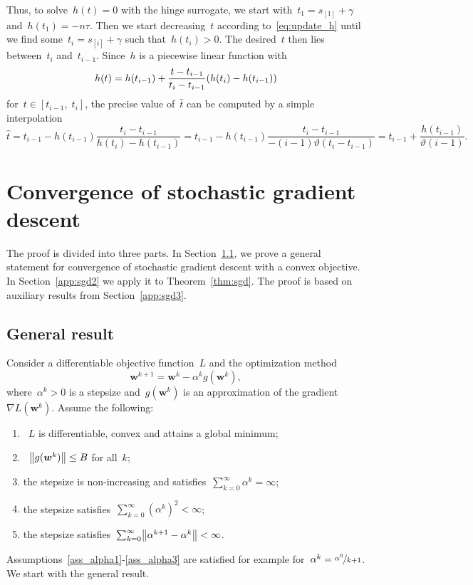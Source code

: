 \noindent Thus, to solve~$h(t) = 0$ with the hinge surrogate, we start with~$t_1 = s_{[1]}  + \gamma$ and~$h(t_1) = -n\tau$. Then we start decreasing~$t$ according to~\eqref{eq:update_h} until we find some~$t_i = s_{[i]} + \gamma$ such that~$h(t_i) > 0$. The desired~$t$ then lies between~$t_i$ and~$t_{i-1}$. Since~$h$ is a piecewise linear function with
\begin{equation*}
  h(t) = h(t_{i-1}) + \frac{t - t_{i-1}}{t_{i} - t_{i-1}}\Brac{h(t_{i}) - h(t_{i-1})}
\end{equation*}
for~$t \in [t_{i-1}, \; t_{i}]$, the precise value of~$\hat{t}$ can be computed by a simple interpolation
\begin{equation*}
  \hat{t}
    = t_{i-1} - h(t_{i-1})\frac{t_{i} - t_{i-1}}{h(t_{i}) - h(t_{i-1})}
    = t_{i-1} - h(t_{i-1})\frac{t_{i} - t_{i-1}}{-(i-1)\vartheta(t_{i} - t_{i-1})}
    = t_{i-1} + \frac{h(t_{i-1})}{\vartheta(i-1)}.
\end{equation*}

\section{Convergence of stochastic gradient descent}

The proof is divided into three parts. In Section~\ref{app:sgd1}, we prove a general statement for convergence of stochastic gradient descent with a convex objective. In Section~\ref{app:sgd2} we apply it to Theorem~\ref{thm:sgd}. The proof is based on auxiliary results from Section~\ref{app:sgd3}.

\subsection{General result}\label{app:sgd1}

Consider a differentiable objective function~$L$ and the optimization method
\begin{equation}\label{eq:update}
  \bm{w}^{k+1} = \bm{w}^k - \alpha^k g(\bm{w}^k),
\end{equation}
where~$\alpha^k > 0$ is a stepsize and~$g(\bm{w}^k)$ is an approximation of the gradient~$\nabla L(\bm{w}^k)$. Assume the following:
\begin{enumerate}[label={(A\arabic*)}]
  \item \label{ass_convex}~$L$ is differentiable, convex and attains a global minimum;
  \item \label{ass_gbound}~$\norm{g(\bm{w}^k)}\leq B$ for all~$k$;
  \item \label{ass_alpha1} the stepsize is non-increasing and satisfies~$\sum_{k=0}^\infty \alpha^k = \infty$;
  \item \label{ass_alpha2} the stepsize satisfies~$\sum_{k=0}^\infty (\alpha^k)^2<\infty$;
  \item \label{ass_alpha3} the stepsize satisfies~$\sum_{k=0}^\infty \norm{\alpha^{k+1}-  \alpha^k}<\infty$.
\end{enumerate}
Assumptions~\ref{ass_alpha1}-\ref{ass_alpha3} are satisfied for example for~$\alpha^k = \nicefrac{\alpha^0}{k+1}$. We start with the general result.


